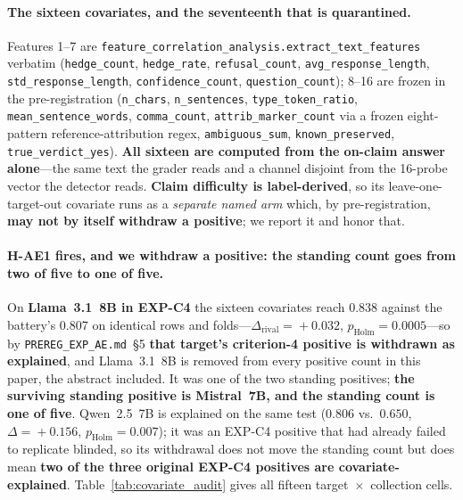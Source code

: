 \paragraph{The sixteen covariates, and the seventeenth that is quarantined.} Features 1--7 are \texttt{feature\_correlation\_analysis.extract\_text\_features} verbatim (\texttt{hedge\_count}, \texttt{hedge\_rate}, \texttt{refusal\_count}, \texttt{avg\_response\_length}, \texttt{std\_response\_length}, \texttt{confidence\_count}, \texttt{question\_count}); 8--16 are frozen in the pre-registration (\texttt{n\_chars}, \texttt{n\_sentences}, \texttt{type\_token\_ratio}, \texttt{mean\_sentence\_words}, \texttt{comma\_count}, \texttt{attrib\_marker\_count} via a frozen eight-pattern reference-attribution regex, \texttt{ambiguous\_sum}, \texttt{known\_preserved}, \texttt{true\_verdict\_yes}). \textbf{All sixteen are computed from the on-claim answer alone}---the same text the grader reads and a channel disjoint from the 16-probe vector the detector reads. \textbf{Claim difficulty is label-derived}, so its leave-one-target-out covariate runs as a \emph{separate named arm} which, by pre-registration, \textbf{may not by itself withdraw a positive}; we report it and honor that.

\paragraph{H-AE1 fires, and we withdraw a positive: the standing count goes from two of five to \textbf{one of five}.} On \textbf{Llama~3.1~8B in EXP-C4} the sixteen covariates reach $0.838$ against the battery's $0.807$ on identical rows and folds---$\Delta_{\mathrm{rival}}\!=\!+0.032$, $p_{\mathrm{Holm}}\!=\!0.0005$---so by \texttt{PREREG\_EXP\_AE.md}~\S5 \textbf{that target's criterion-4 positive is withdrawn as explained}, and Llama~3.1~8B is removed from every positive count in this paper, the abstract included. It was one of the two standing positives; \textbf{the surviving standing positive is Mistral~7B, and the standing count is one of five}. Qwen~2.5~7B is explained on the same test ($0.806$ vs.\ $0.650$, $\Delta\!=\!+0.156$, $p_{\mathrm{Holm}}\!=\!0.007$); it was an EXP-C4 positive that had already failed to replicate blinded, so its withdrawal does not move the standing count but does mean \textbf{two of the three original EXP-C4 positives are covariate-explained}. Table~\ref{tab:covariate_audit} gives all fifteen target~$\times$~collection cells.


